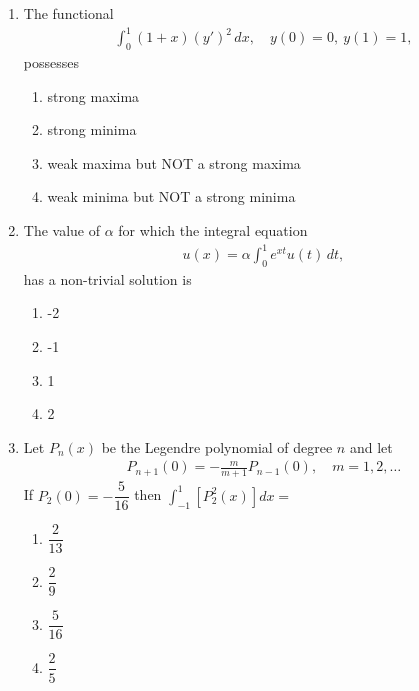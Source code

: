 \documentclass[journal]{IEEEtran}
\numberwithin{equation}{enumi}
\numberwithin{figure}{enumi}
\begin{document}
\begin{enumerate}
\item The functional
\begin{align*}
\int_0^1 (1+x)(y')^2 \, dx,\quad y(0) = 0,\ y(1) = 1,
\end{align*}
possesses
\hfill{}

    \begin{enumerate}
        \item strong maxima
        \item strong minima
        \item weak maxima but NOT a strong maxima
        \item weak minima but NOT a strong minima   
    \end{enumerate}
  

\item The value of $\alpha$ for which the integral equation
\begin{align*}
u(x) = \alpha \int_0^1 e^{xt} u(t)\,dt,
\end{align*}
has a non-trivial solution is
\hfill{}
\begin{multicols}{4}
\begin{enumerate}
    \item -2
    \item -1
    \item 1
    \item 2
\end{enumerate}
\end{multicols}



\item Let $P_n(x)$ be the Legendre polynomial of degree $n$ and let
\begin{align*}
P_{n+1}(0) = -\frac{m}{m+1} P_{n-1}(0), \quad m = 1, 2, \ldots
\end{align*}
If $P_2(0) = -\dfrac{5}{16}$ then $\int_{-1}^1 \left[P_2^2(x)\right] dx =$
\hfill{}
\begin{multicols}{4}
\begin{enumerate}
    \item $\dfrac{2}{13}$
    \item $\dfrac{2}{9}$
    \item $\dfrac{5}{16}$ 
    \item $\dfrac{2}{5}$
\end{enumerate}
\end{multicols}




\end{enumerate}
\end{document}

